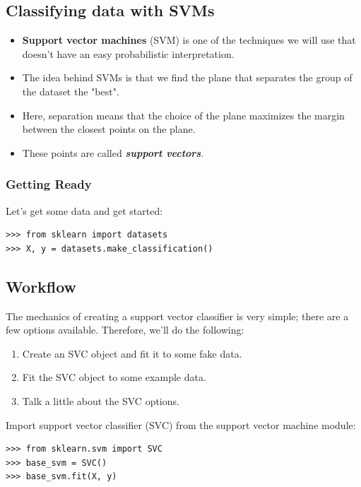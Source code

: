 \documentclass[SKL-MASTER.tex]{subfiles}
\begin{document}
\Large
\subsection*{Classifying data with SVMs}
\begin{itemize}
\item \textbf{Support vector machines} (SVM) is one of the techniques we will use that doesn't have
an easy probabilistic interpretation. 
\item The idea behind SVMs is that we find the plane that
separates the group of the dataset the "best". 
\item Here, separation means that the choice
of the plane maximizes the margin between the closest points on the plane.
\item  These points
are called \textbf{\textit{support vectors}}.
\end{itemize}

\subsubsection*{Getting Ready}
Let's get some data and get started:
\begin{framed}
\begin{verbatim}
>>> from sklearn import datasets
>>> X, y = datasets.make_classification()
\end{verbatim}
\end{framed}
\subsection*{Workflow}
The mechanics of creating a support vector classifier is very simple; there are a few options
available. Therefore, we'll do the following:
\begin{enumerate}
\item Create an SVC object and fit it to some fake data.
\item Fit the SVC object to some example data.
\item Talk a little about the SVC options.
\end{enumerate}
Import support vector classifier (SVC) from the support vector machine module:

\begin{framed}
\begin{verbatim}
>>> from sklearn.svm import SVC
>>> base_svm = SVC()
>>> base_svm.fit(X, y)
\end{verbatim}
\end{framed}
\end{document}
